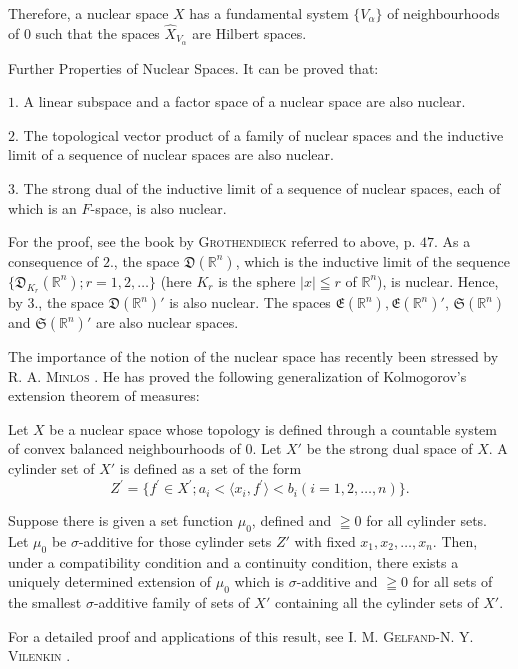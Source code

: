 Therefore, a nuclear space $X$ has a fundamental system $\{V_{\alpha}\}$ of neighbourhoods of $0$ such that the spaces $\hat{X}_{V_{\alpha}}$ are Hilbert spaces. 

Further Properties of Nuclear Spaces. It can be proved that: 

$1$. A linear subspace and a factor space of a nuclear space are also nuclear. 

$2$. The topological vector product of a family of nuclear spaces and the inductive limit of a sequence of nuclear spaces are also nuclear. 

$3$. The strong dual of the inductive limit of a sequence of nuclear spaces, each of which is an $F$-space, is also nuclear. 

For the proof, see the book by \textsc{Grothendieck} \cite{grothendieck87} referred to above, p. $47$. As a consequence of $2$., the space $\mathfrak{D}(\mathbb{R}^{n})$, which is the inductive limit of the sequence $\{\mathfrak{D}_{K_{r}}(\mathbb{R}^{n}); r = 1, 2, \ldots\}$ (here $K_r$ is the sphere $|x| \leqq r$ of $\mathbb{R}^{n}$), is nuclear. Hence, by $3$., the space $\mathfrak{D}(\mathbb{R}^{n})'$ is also nuclear. The spaces $\mathfrak{E}(\mathbb{R}^{n}), \mathfrak{E}(\mathbb{R}^{n})'$, $\mathfrak{S}(\mathbb{R}^{n})$ and $\mathfrak{S}(\mathbb{R}^{n})'$ are also nuclear spaces. 

The importance of the notion of the nuclear space has recently been stressed by R. A. \textsc{Minlos} \cite{minlos202}. He has proved the following generalization of Kolmogorov's extension theorem of measures: 

Let $X$ be a nuclear space whose topology is defined through a countable system of convex balanced neighbourhoods of $0$. Let $X'$ be the strong dual space of $X$. A cylinder set of $X'$ is defined as a set of the form 
\[
Z ^{\prime} = \{f ^{\prime} \in X ^{\prime}; a _{i} < \langle x _{i}, f ^{\prime} \rangle < b _{i} (i = 1, 2, \dots , n) \}.
\]

Suppose there is given a set function $\mu_{0}$, defined and $\geqq 0$ for all cylinder sets. Let $\mu_{0}$ be $\sigma$-additive for those cylinder sets $Z'$ with fixed $x_{1}, x_{2}, \ldots, x_{n}$. Then, under a compatibility condition and a continuity condition, there exists a uniquely determined extension of $\mu_{0}$ which is $\sigma$-additive and $\geqq 0$ for all sets of the smallest $\sigma$-additive family of sets of $X'$ containing all the cylinder sets of $X'$. 

For a detailed proof and applications of this result, see I. M. \textsc{Gelfand}-N. Y. \textsc{Vilenkin} \cite{gelfand77}. 
